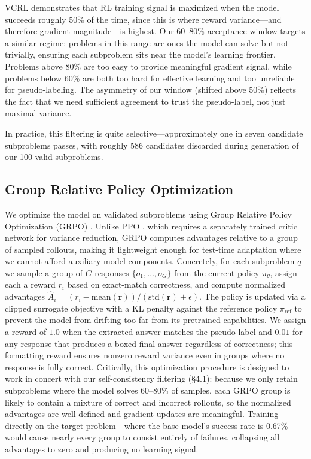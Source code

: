 \documentclass{article}
\begin{document}
VCRL \cite{vcrl} demonstrates that RL training signal is maximized when the model succeeds roughly 50\% of the time, since this is where reward variance---and therefore gradient magnitude---is highest. Our 60--80\% acceptance window targets a similar regime: problems in this range are ones the model can solve but not trivially, ensuring each subproblem sits near the model's learning frontier. Problems above 80\% are too easy to provide meaningful gradient signal, while problems below 60\% are both too hard for effective learning and too unreliable for pseudo-labeling. The asymmetry of our window (shifted above 50\%) reflects the fact that we need sufficient agreement to trust the pseudo-label, not just maximal variance.
 
In practice, this filtering is quite selective---approximately one in seven candidate subproblems passes, with roughly 586 candidates discarded during generation of our 100 valid subproblems.

\subsection{Group Relative Policy Optimization}
 
We optimize the model on validated subproblems using Group Relative Policy Optimization (GRPO) \cite{grpo}. Unlike PPO \cite{ppo}, which requires a separately trained critic network for variance reduction, GRPO computes advantages relative to a group of sampled rollouts, making it lightweight enough for test-time adaptation where we cannot afford auxiliary model components. Concretely, for each subproblem $q$ we sample a group of $G$ responses $\{o_1, \ldots, o_G\}$ from the current policy $\pi_\theta$, assign each a reward $r_i$ based on exact-match correctness, and compute normalized advantages $\hat{A}_i = (r_i - \text{mean}(\mathbf{r})) / (\text{std}(\mathbf{r}) + \epsilon)$. The policy is updated via a clipped surrogate objective with a KL penalty against the reference policy $\pi_{\text{ref}}$ to prevent the model from drifting too far from its pretrained capabilities. We assign a reward of $1.0$ when the extracted answer matches the pseudo-label and $0.01$ for any response that produces a boxed final answer regardless of correctness; this formatting reward ensures nonzero reward variance even in groups where no response is fully correct. Critically, this optimization procedure is designed to work in concert with our self-consistency filtering (\S4.1): because we only retain subproblems where the model solves 60--80\% of samples, each GRPO group is likely to contain a mixture of correct and incorrect rollouts, so the normalized advantages are well-defined and gradient updates are meaningful. Training directly on the target problem---where the base model's success rate is 0.67\%---would cause nearly every group to consist entirely of failures, collapsing all advantages to zero and producing no learning signal.
\end{document}

